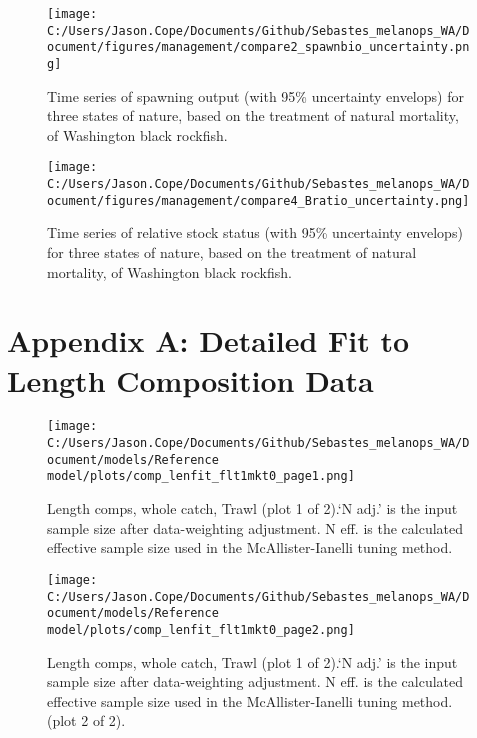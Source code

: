 \documentclass[11pt,
  english,
  letterpaper,
]{article}
\begin{document}
\pagebreak

\begin{figure}
\centering
\texttt{[image: C:/Users/Jason.Cope/Documents/Github/Sebastes\_melanops\_WA/Document/figures/management/compare2\_spawnbio\_uncertainty.png]}
\caption{Time series of spawning output (with 95\% uncertainty envelops) for three states of nature, based on the treatment of natural mortality, of Washington black rockfish.\label{fig:stateofnature_SO}}
\end{figure}

\begin{figure}
\centering
\texttt{[image: C:/Users/Jason.Cope/Documents/Github/Sebastes\_melanops\_WA/Document/figures/management/compare4\_Bratio\_uncertainty.png]}
\caption{Time series of relative stock status (with 95\% uncertainty envelops) for three states of nature, based on the treatment of natural mortality, of Washington black rockfish.\label{fig:stateofnature_depl}}
\end{figure}

\newpage

\clearpage

\hypertarget{app-a}{%
\section{Appendix A: Detailed Fit to Length Composition Data}\label{app-a}}

\begin{figure}
\centering
\texttt{[image: C:/Users/Jason.Cope/Documents/Github/Sebastes\_melanops\_WA/Document/models/Reference model/plots/comp\_lenfit\_flt1mkt0\_page1.png]}
\caption{Length comps, whole catch, Trawl (plot 1 of 2).`N adj.' is the input sample size after data-weighting adjustment. N eff. is the calculated effective sample size used in the McAllister-Ianelli tuning method.\label{fig:comp_lenfit_flt1mkt0_page1}}
\end{figure}

\begin{figure}
\centering
\texttt{[image: C:/Users/Jason.Cope/Documents/Github/Sebastes\_melanops\_WA/Document/models/Reference model/plots/comp\_lenfit\_flt1mkt0\_page2.png]}
\caption{Length comps, whole catch, Trawl (plot 1 of 2).`N adj.' is the input sample size after data-weighting adjustment. N eff. is the calculated effective sample size used in the McAllister-Ianelli tuning method. (plot 2 of 2).\label{fig:comp_lenfit_flt1mkt0_page2}}
\end{figure}
\end{document}
